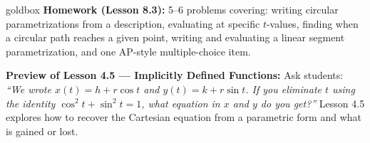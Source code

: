 \documentclass[10pt]{article}
\begin{document}
\vspace{0.08in}

\begin{skillbox}{goldbox}
\textbf{Homework (Lesson 8.3):} 5--6 problems covering: writing
circular parametrizations from a description, evaluating at specific
$t$-values, finding when a circular path reaches a given point,
writing and evaluating a linear segment parametrization, and one
AP-style multiple-choice item.

\textbf{Preview of Lesson 4.5 --- Implicitly Defined Functions:}
Ask students: \textit{``We wrote $x(t) = h + r\cos t$ and
$y(t) = k + r\sin t$. If you eliminate $t$ using the identity
$\cos^2 t + \sin^2 t = 1$, what equation in $x$ and $y$ do you get?''}
Lesson 4.5 explores how to recover the Cartesian equation from a
parametric form and what is gained or lost.
\end{skillbox}
\end{document}
